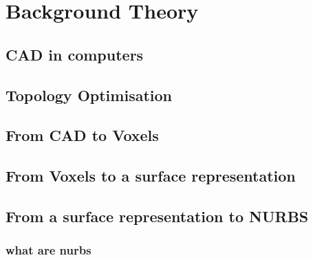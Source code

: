 \chapter{Background Theory}
\label{chapter:Background}

\section{CAD in computers}


\section{Topology Optimisation}

\section{From CAD to Voxels}

\section{From Voxels to a surface representation}

\section{From a surface representation to NURBS}

\subsection{what are nurbs}%

